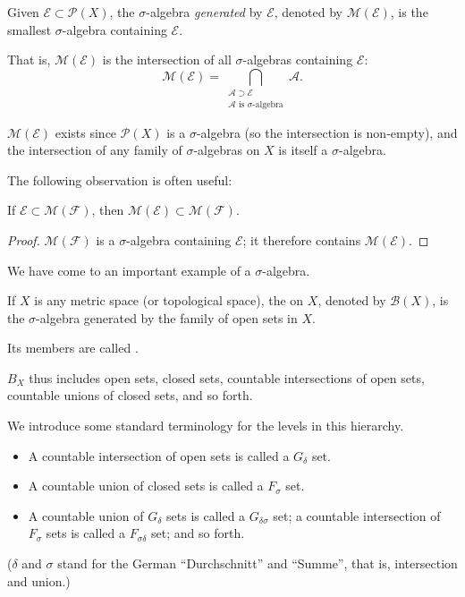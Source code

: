 \begin{definition}
Given $\mathcal{E}\subset\mathcal{P}(X)$, the $\sigma$-algebra \emph{generated} by $\mathcal{E}$, denoted by $\mathcal{M}(\mathcal{E})$, is the smallest $\sigma$-algebra containing $\mathcal{E}$.
\end{definition}

That is, $\mathcal{M}(\mathcal{E})$ is the intersection of all $\sigma$-algebras containing $\mathcal{E}$:
\[\mathcal{M}(\mathcal{E})=\bigcap_{\substack{\mathcal{A}\supset\mathcal{E}\\ \text{$\mathcal{A}$ is $\sigma$-algebra}}}\mathcal{A}.\]

$\mathcal{M}(\mathcal{E})$ exists since $\mathcal{P}(X)$ is a $\sigma$-algebra (so the intersection is non-empty), and the intersection of any family of $\sigma$-algebras on $X$ is itself a $\sigma$-algebra.

The following observation is often useful:

\begin{lemma}
If $\mathcal{E}\subset\mathcal{M}(\mathcal{F})$, then $\mathcal{M}(\mathcal{E})\subset\mathcal{M}(\mathcal{F})$.
\end{lemma}

\begin{proof}
$\mathcal{M}(\mathcal{F})$ is a $\sigma$-algebra containing $\mathcal{E}$; it therefore contains $\mathcal{M}(\mathcal{E})$.
\end{proof}

We have come to an important example of a $\sigma$-algebra.

\begin{definition}
If $X$ is any metric space (or topological space), the  on $X$, denoted by $\mathcal{B}(X)$, is the $\sigma$-algebra generated by the family of open sets in $X$.

Its members are called .
\end{definition}

$B_X$ thus includes open sets, closed sets, countable intersections of open sets, countable unions of closed sets, and so forth.

We introduce some standard terminology for the levels in this hierarchy.
\begin{itemize}
\item A countable intersection of open sets is called a $G_\delta$ set.
\item A countable union of closed sets is called a $F_\sigma$ set.
\item A countable union of $G_\delta$ sets is called a $G_{\delta\sigma}$ set; a countable intersection of $F_\sigma$ sets is called a $F_{\sigma\delta}$ set; and so forth.
\end{itemize}
($\delta$ and $\sigma$ stand for the German ``Durchschnitt'' and ``Summe'', that is, intersection and union.)

